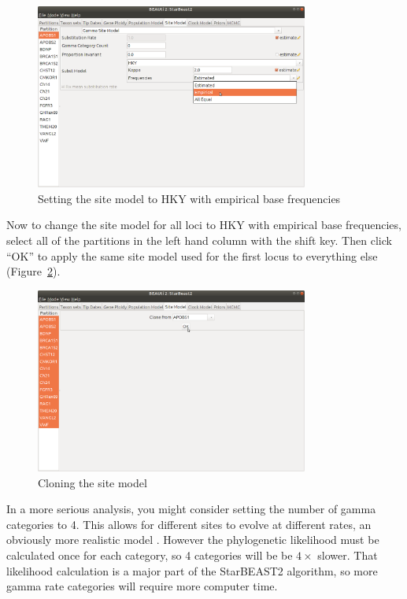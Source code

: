 \documentclass[12pt]{article}
\begin{document}
\begin{figure}[htb!]
\centering
\includegraphics[width=0.8\textwidth]{figures/hky.png}
\caption
{Setting the site model to HKY with empirical base frequencies}
\label{fig:hky}
\end{figure}

Now to change the site model for all loci to HKY with empirical base frequencies,
select all of the partitions in the left hand column with the shift key. Then
click ``OK'' to apply the same site model used for the first locus
to everything else (Figure~\ref{fig:cloneSiteModel}).

\newpage{}

\begin{figure}[htb!]
\centering
\includegraphics[width=0.8\textwidth]{figures/cloneSiteModel.png}
\caption
{Cloning the site model}
\label{fig:cloneSiteModel}
\end{figure}

In a more serious analysis, you might consider setting the number of gamma
categories to 4. This allows for different sites to evolve at
different rates, an obviously more realistic model \citep{Yang1994}. However
the phylogenetic likelihood must be calculated once for each category, so 4
categories will be be $4\times$ slower. That likelihood calculation is a major
part of the StarBEAST2 algorithm, so more gamma rate categories will require
more computer time.
\end{document}
